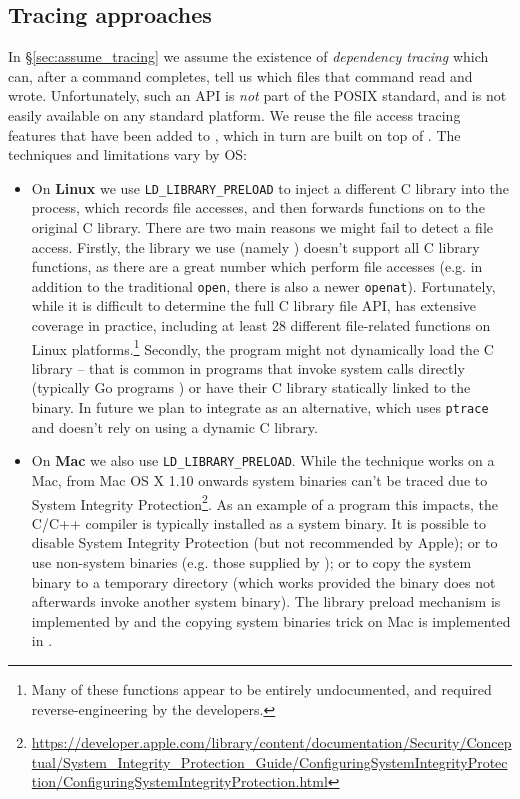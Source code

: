 \subsection{Tracing approaches}
\label{sec:tracing}

In \S\ref{sec:assume_tracing} we assume the existence of \emph{dependency tracing} which can, after a command completes, tell us which files that command read and wrote. Unfortunately, such an API is \emph{not} part of the POSIX standard, and is not easily available on any standard platform. We reuse the file access tracing features that have been added to \Shake \cite{neil:file_access}, which in turn are built on top of \Fsatrace \cite{fsatrace}. The techniques and limitations vary by OS:

\begin{itemize}
\item On \textbf{Linux} we use \texttt{LD\_LIBRARY\_PRELOAD} to inject a different C library into the process, which records file accesses, and then forwards functions on to the original C library. There are two main reasons we might fail to detect a file access. Firstly, the library we use (namely \Fsatrace) doesn't support all C library functions, as there are a great number which perform file accesses (e.g. in addition to the traditional \texttt{open}, there is also a newer \texttt{openat}). Fortunately, while it is difficult to determine the full C library file API, \Fsatrace has extensive coverage in practice, including at least 28 different file-related functions on Linux platforms.\footnote{Many of these functions appear to be entirely undocumented, and required reverse-engineering by the \Fsatrace developers.} Secondly, the program might not dynamically load the C library -- that is common in programs that invoke system calls directly (typically Go programs \cite{go}) or have their C library statically linked to the binary. In future we plan to integrate \Bigbro \cite{bigbro} as an alternative, which uses \texttt{ptrace} and doesn't rely on using a dynamic C library.
\item On \textbf{Mac} we also use \texttt{LD\_LIBRARY\_PRELOAD}. While the technique works on a Mac, from Mac OS X 1.10 onwards system binaries can't be traced due to System Integrity Protection\footnote{\url{https://developer.apple.com/library/content/documentation/Security/Conceptual/System_Integrity_Protection_Guide/ConfiguringSystemIntegrityProtection/ConfiguringSystemIntegrityProtection.html}}. As an example of a program this impacts, the C/C++ compiler is typically installed as a system binary. It is possible to disable System Integrity Protection (but not recommended by Apple); or to use non-system binaries (e.g. those supplied by \Nix \cite{nix}); or to copy the system binary to a temporary directory (which works provided the binary does not afterwards invoke another system binary). The library preload mechanism is implemented by \Fsatrace and the copying system binaries trick on Mac is implemented in \Shake.

\end{itemize}
